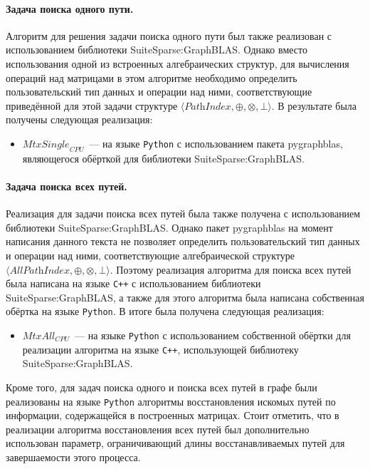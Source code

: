\paragraph{Задача поиска одного пути.} Алгоритм для решения задачи поиска одного пути был также реализован с использованием библиотеки SuiteSparse:GraphBLAS. Однако вместо использования одной из встроенных алгебраических структур, для вычисления операций над матрицами в этом алгоритме необходимо определить пользовательский тип данных и операции над ними, соответствующие приведённой для этой задачи структуре $\langle \textit{PathIndex}, \oplus, \otimes, \bot \rangle$. В результате была получены следующая реализация:
\begin{itemize}
    \item $\textit{MtxSingle}_{\textit{CPU}}$~--- на языке \texttt{Python} с использованием пакета pygraphblas, являющегося обёрткой для библиотеки SuiteSparse:GraphBLAS.
\end{itemize}

\paragraph{Задача поиска всех путей.} Реализация для задачи поиска всех путей была также получена с использованием библиотеки SuiteSparse:GraphBLAS. Однако пакет pygraphblas на момент написания данного текста не позволяет определить пользовательский тип данных и операции над ними, соответствующие алгебраической структуре $\langle \textit{AllPathIndex}, \oplus, \otimes, \bot \rangle$. Поэтому реализация алгоритма для поиска всех путей была написана на языке \texttt{C++} с использованием библиотеки SuiteSparse:GraphBLAS, а также для этого алгоритма была написана собственная обёртка на языке \texttt{Python}. В итоге была получена следующая реализация:
\begin{itemize}
    \item $\textit{MtxAll}_{\textit{CPU}}$~--- на языке \texttt{Python} с использованием собственной обёртки для реализации алгоритма на языке \texttt{C++}, использующей библиотеку SuiteSparse:GraphBLAS.
\end{itemize}

Кроме того, для задач поиска одного и поиска всех путей в графе были реализованы на языке \texttt{Python} алгоритмы восстановления искомых путей по информации, содержащейся в построенных матрицах. Стоит отметить, что в реализации алгоритма восстановления всех путей был дополнительно использован параметр, ограничивающий длины восстанавливаемых путей для завершаемости этого процесса.

\clearpage
